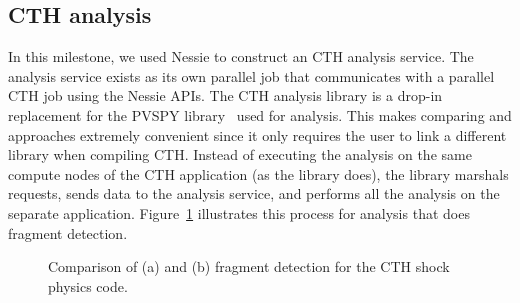 \subsection{CTH \intransit analysis}

In this milestone, we used Nessie to construct an \intransit CTH analysis 
service.  The analysis service exists as its own parallel job 
that communicates with a parallel CTH job using the Nessie APIs.  
The \intransit CTH analysis library is a drop-in replacement
for the PVSPY library~\cite{moreland:2010:coprocessing-milestone} used for
\insitu analysis.  This makes comparing \insitu and \intransit approaches
extremely convenient since it only requires the user to link a different
library when compiling CTH.  Instead of executing the analysis on the 
same compute nodes of the CTH application (as the \insitu library does), the
\intransit library marshals requests, sends data to the analysis service, and
performs all the analysis on the separate application.
Figure~\ref{fig:cth-service} illustrates this process for analysis that does
fragment detection. 

\begin{figure}
\begin{centering}
\caption[\Insitu and \Intransit Analysis]{Comparison of \insitu (a) and \intransit (b)
fragment detection for the CTH shock physics code.}
\label{fig:cth-service}
\end{centering}
\end{figure}

